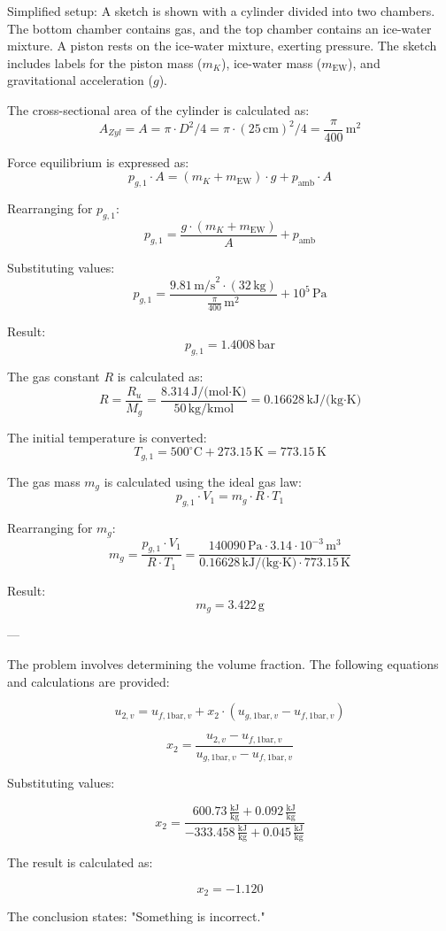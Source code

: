 Simplified setup:  
A sketch is shown with a cylinder divided into two chambers. The bottom chamber contains gas, and the top chamber contains an ice-water mixture. A piston rests on the ice-water mixture, exerting pressure. The sketch includes labels for the piston mass (\(m_K\)), ice-water mass (\(m_{\text{EW}}\)), and gravitational acceleration (\(g\)).

The cross-sectional area of the cylinder is calculated as:  
\[
A_{Zyl} = A = \pi \cdot D^2 / 4 = \pi \cdot (25 \, \text{cm})^2 / 4 = \frac{\pi}{400} \, \text{m}^2
\]

Force equilibrium is expressed as:  
\[
p_{g,1} \cdot A = (m_K + m_{\text{EW}}) \cdot g + p_{\text{amb}} \cdot A
\]

Rearranging for \(p_{g,1}\):  
\[
p_{g,1} = \frac{g \cdot (m_K + m_{\text{EW}})}{A} + p_{\text{amb}}
\]

Substituting values:  
\[
p_{g,1} = \frac{9.81 \, \text{m/s}^2 \cdot (32 \, \text{kg})}{\frac{\pi}{400} \, \text{m}^2} + 10^5 \, \text{Pa}
\]

Result:  
\[
p_{g,1} = 1.4008 \, \text{bar}
\]

The gas constant \(R\) is calculated as:  
\[
R = \frac{R_u}{M_g} = \frac{8.314 \, \text{J/(mol·K)}}{50 \, \text{kg/kmol}} = 0.16628 \, \text{kJ/(kg·K)}
\]

The initial temperature is converted:  
\[
T_{g,1} = 500^\circ\text{C} + 273.15 \, \text{K} = 773.15 \, \text{K}
\]

The gas mass \(m_g\) is calculated using the ideal gas law:  
\[
p_{g,1} \cdot V_1 = m_g \cdot R \cdot T_1
\]

Rearranging for \(m_g\):  
\[
m_g = \frac{p_{g,1} \cdot V_1}{R \cdot T_1} = \frac{140090 \, \text{Pa} \cdot 3.14 \cdot 10^{-3} \, \text{m}^3}{0.16628 \, \text{kJ/(kg·K)} \cdot 773.15 \, \text{K}}
\]

Result:  
\[
m_g = 3.422 \, \text{g}
\]

---

The problem involves determining the volume fraction. The following equations and calculations are provided:

\[
u_{2,v} = u_{f,1\text{bar},v} + x_2 \cdot (u_{g,1\text{bar},v} - u_{f,1\text{bar},v})
\]

\[
x_2 = \frac{u_{2,v} - u_{f,1\text{bar},v}}{u_{g,1\text{bar},v} - u_{f,1\text{bar},v}}
\]

Substituting values:

\[
x_2 = \frac{600.73 \, \frac{\text{kJ}}{\text{kg}} + 0.092 \, \frac{\text{kJ}}{\text{kg}}}{-333.458 \, \frac{\text{kJ}}{\text{kg}} + 0.045 \, \frac{\text{kJ}}{\text{kg}}}
\]

The result is calculated as:

\[
x_2 = -1.120
\]

The conclusion states:  
"Something is incorrect."